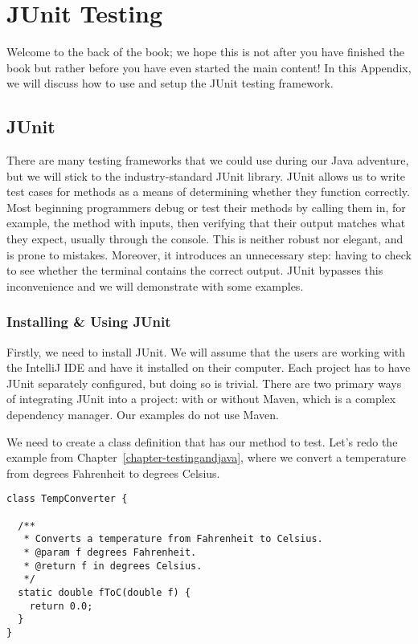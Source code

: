 \appendix
\chapter{JUnit Testing}
\label{appendix-junit} %

Welcome to the back of the book; we hope this is not after you have finished the book but rather before you have even started the main content! 
In this Appendix, we will discuss how to use and setup the JUnit testing framework.

\section{JUnit}

There are many testing frameworks that we could use during our Java adventure, but we will stick to the industry-standard JUnit library. 
JUnit allows us to write test cases for methods as a means of determining whether they function correctly. 
Most beginning programmers debug or test their methods by calling them in, for example, the  method with inputs, then verifying that their output matches what they expect, usually through the console. 
This is neither robust nor elegant, and is prone to mistakes. 
Moreover, it introduces an unnecessary step: having to check to see whether the terminal contains the correct output.
JUnit bypasses this inconvenience and we will demonstrate with some examples.

\subsection{Installing \& Using JUnit}

Firstly, we need to install JUnit. 
We will assume that the users are working with the IntelliJ IDE and have it installed on their computer. 
Each project has to have JUnit separately configured, but doing so is trivial. 
There are two primary ways of integrating JUnit into a project: with or without Maven, which is a complex dependency manager. 
Our examples do not use Maven.

We need to create a class definition that has our method to test. 
Let's redo the example from Chapter~\ref{chapter-testingandjava}, where we convert a temperature from degrees Fahrenheit to degrees Celsius.

\begin{lstlisting}[language=MyJava]
class TempConverter {

  /**
   * Converts a temperature from Fahrenheit to Celsius.
   * @param f degrees Fahrenheit.
   * @return f in degrees Celsius.
   */
  static double fToC(double f) {
    return 0.0;
  }
}
\end{lstlisting}

